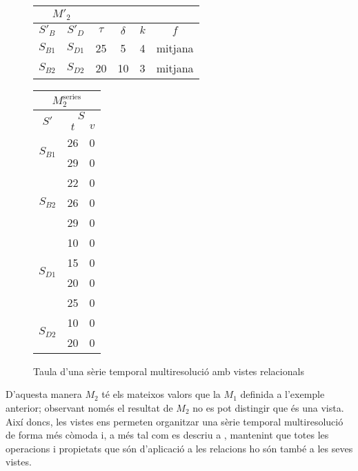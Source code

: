 \begin{example} 
  \begin{figure}[tp]
    \centering
    \begin{tabular}{|c|c|c|c|c|c|}
      \multicolumn{2}{c}{$M'_2$} \\ \hline
      $S'_B$  & $S'_D$ & $\tau$ & $\delta$ & $k$ & $f$ \\ \hline
      $S_{B1}$ & $S_{D1}$ & 25 & 5  & 4 & mitjana  \\
      $S_{B2}$ & $S_{D2}$ & 20 & 10 & 3 & mitjana  \\ \hline
    \end{tabular}\qquad
    \begin{tabular}{|c|c|c|}
      \multicolumn{3}{c}{$M^{\text{series}}_{2}$} \\ \hline
      \multirow{2}{*}{$S'$}  &  \multicolumn{2}{c|}{$S$} \\ \cline{2-3}
      & $t$      & $v$  \\ \hline
      \multirow{2}{*}{$S_{B1}$} 
      & 26 & 0 \\ 
      & 29 & 0 \\ \hline
      \multirow{3}{*}{$S_{B2}$} 
      & 22 & 0 \\ 
      & 26 & 0 \\ 
      & 29 & 0 \\ \hline
      \multirow{4}{*}{$S_{D1}$} 
      & 10 & 0 \\ 
      & 15 & 0 \\ 
      & 20 & 0 \\ 
      & 25 & 0 \\ \hline
      \multirow{2}{*}{$S_{D2}$} 
      & 10 & 0 \\ 
      & 20 & 0 \\ \hline
    \end{tabular}
    \caption{Taula d'una sèrie temporal multiresolució amb vistes
      relacionals}
    \label{fig:model:stm:vistes}
  \end{figure}


  D'aquesta manera $M_2$ té els mateixos valors que la $M_1$ definida
  a l'exemple anterior; observant només el resultat de $M_2$ no es pot
  distingir que és una vista. Així doncs, les vistes ens permeten
  organitzar una sèrie temporal multiresolució de forma més còmoda i,
  a més tal com es descriu a \textcite{date13}, mantenint que totes
  les operacions i propietats que són d'aplicació a les relacions ho
  són també a les seves vistes.





\end{example}



